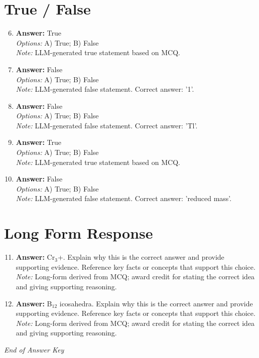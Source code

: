 \documentclass[12pt]{article}
\begin{document}
\section*{True / False}
\begin{enumerate}[label=\arabic*.]
\setcounter{enumi}{5}
\item \textbf{Answer:} True
\\ \textit{Options:} A) True; B) False
\\ \textit{Note:} LLM-generated true statement based on MCQ.
\item \textbf{Answer:} False
\\ \textit{Options:} A) True; B) False
\\ \textit{Note:} LLM-generated false statement. Correct answer: '1'.
\item \textbf{Answer:} False
\\ \textit{Options:} A) True; B) False
\\ \textit{Note:} LLM-generated false statement. Correct answer: 'Tl'.
\item \textbf{Answer:} True
\\ \textit{Options:} A) True; B) False
\\ \textit{Note:} LLM-generated true statement based on MCQ.
\item \textbf{Answer:} False
\\ \textit{Options:} A) True; B) False
\\ \textit{Note:} LLM-generated false statement. Correct answer: 'reduced mass'.
\end{enumerate}

\section*{Long Form Response}
\begin{enumerate}[label=\arabic*.]
\setcounter{enumi}{10}
\item \textbf{Answer:} Cr$_{3}$+. Explain why this is the correct answer and provide supporting evidence. Reference key facts or concepts that support this choice.
\\ \textit{Note:} Long-form derived from MCQ; award credit for stating the correct idea and giving supporting reasoning.
\item \textbf{Answer:} B$_{12}$ icosahedra. Explain why this is the correct answer and provide supporting evidence. Reference key facts or concepts that support this choice.
\\ \textit{Note:} Long-form derived from MCQ; award credit for stating the correct idea and giving supporting reasoning.
\end{enumerate}

\vfill
\noindent\textit{End of Answer Key}
\end{document}
